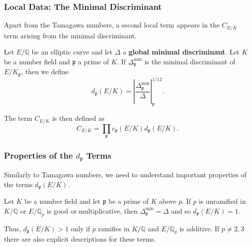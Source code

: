 \documentclass{beamer}
\newcommand{\QQ}{\mathbb{Q}}
\newcommand{\pp}{\mathfrak{p}}
\theoremstyle{plain}
\begin{document}
\begin{frame}
    \frametitle{Local Data: The Minimal Discriminant}
    Apart from the Tamagawa numbers, a second local term appears in the $C_{E/K}$ term arising from the minimal discriminant. \pause
    \begin{definition}
        Let $E/\QQ$ be an elliptic curve and let $\Delta$ a \textbf{global minimal discriminant}. \pause Let $K$ be a number field and $\pp$ a prime of $K$. If $\Delta_{\pp}^{\min}$ is the minimal discriminant of $E/K_\pp$, then we define 
        $$d_\pp(E/K)=\left|\frac{\Delta_\pp^{\min}}{\Delta}\right|_\pp^{1/12}.$$
    \end{definition} \pause
    The term $C_{E/K}$ is then defined as 
    $$C_{E/K}=\prod_{\pp}c_\pp(E/K)d_\pp(E/K).$$
\end{frame}

\begin{frame}
    \frametitle{Properties of the $d_\pp$ Terms}
    Similarly to Tamagawa numbers, we need to understand important properties of the terms $d_\pp(E/K)$. \pause
    \begin{lemma}
        Let $K$ be a number field and let $\pp$ be a prime of $K$ above $p$. If $p$ is unramified in $K/\QQ$ or $E/\QQ_p$ is good or multiplicative, then $\Delta_\pp^{\min}=\Delta$ and so $d_\pp(E/K)=1$.
    \end{lemma} \pause
    
    Thus, $d_\pp(E/K)>1$ only if $p$ ramifies in $K/\QQ$ and $E/\QQ_p$ is additive. If $p\neq 2,3$ there are also explicit descriptions for these terms.

\end{frame}
\end{document}
